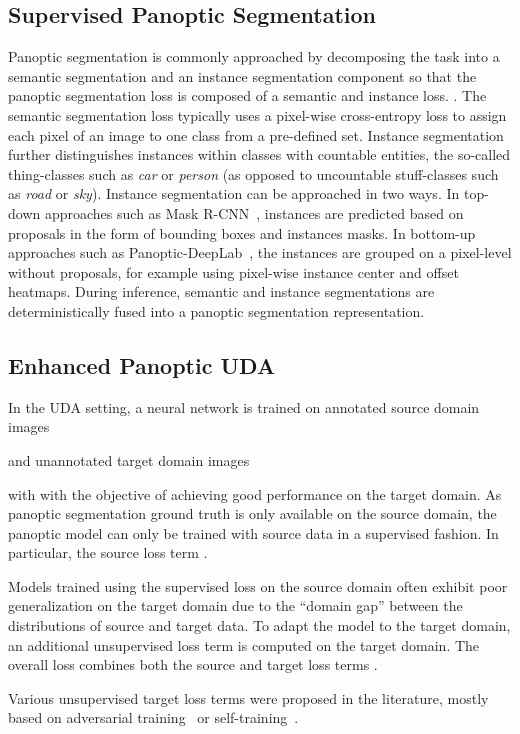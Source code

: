 \documentclass[10pt,twocolumn,letterpaper]{article}
\begin{document}
\subsection{Supervised Panoptic Segmentation}

Panoptic segmentation is commonly approached by decomposing the task into a semantic segmentation and an instance segmentation component so that the panoptic segmentation loss  is composed of a semantic and instance loss. . The semantic segmentation loss typically uses a pixel-wise cross-entropy loss to assign each pixel of an image to one class from a pre-defined set.
Instance segmentation further distinguishes instances within classes with countable entities, the so-called thing-classes such as \emph{car} or \emph{person} (as opposed to uncountable stuff-classes such as \emph{road} or \emph{sky}). Instance segmentation can be approached in two ways. In top-down approaches such as Mask R-CNN~\cite{he2017mask}, instances are predicted based on proposals in the form of bounding boxes and instances masks. In bottom-up approaches such as Panoptic-DeepLab~\cite{cheng2019panoptic}, the instances are grouped on a pixel-level without proposals, for example using pixel-wise instance center and offset heatmaps.
During inference, semantic and instance segmentations are deterministically fused into a panoptic segmentation representation.

\subsection{Enhanced Panoptic UDA}
In the UDA setting, a neural network  is trained on annotated source domain images 
 
and unannotated target domain images 
 
with 
with the objective of achieving good performance on the target domain.
As panoptic segmentation ground truth  is only available on the source domain, the panoptic model can only be trained with source data in a supervised fashion. In particular, the source loss term .

Models trained using the supervised loss  on the source domain often exhibit poor generalization on the target domain due to the ``domain gap'' between the distributions of source and target data.
To adapt the model to the target domain, an additional unsupervised loss term  is computed on the target domain.
The overall loss combines both the source and target loss terms .

Various unsupervised target loss terms were proposed in the literature, mostly based on adversarial training~\cite{tsai2018learning,tsai2019domain,wang2020classes} or self-training~\cite{zou2018unsupervised,zhang2019category,mei2020instance,tranheden2021dacs,zhang2021prototypical,hoyer2021improving}.
\end{document}

